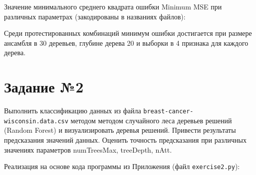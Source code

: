 \documentclass{article} %
\begin{document}
\clearpage
Значение минимального среднего квадрата ошибки Minimum MSE
при различных параметрах (закодированы в названиях файлов):


\begin{figure}[H]
	\centering
	\hfill
\end{figure}
\begin{figure}[H]
	\centering
	\hfill
\end{figure}
\begin{figure}[H]
	\centering
	\hfill
\end{figure}
\begin{figure}[H]
	\centering
	\hfill
\end{figure}
\bigskip

Среди протестированных комбинаций минимум ошибки достигается
при размере ансамбля в 30 деревьев,
глубине дерева 20 и выборки в 4 признака для каждого дерева.

\clearpage
\section{Задание №2}
Выполнить классификацию данных из файла
\verb$breast-cancer-wisconsin.data.csv$ методом
методом случайного леса деревьев решений (Random Forest) и визуализировать деревья
решений. Привести результаты предсказания значений данных. Оценить точность
предсказания при различных значениях параметров numTreesMax, treeDepth, nAtt.
\bigskip

Реализация на основе кода программы из Приложения (файл \verb$exercise2.py$):
\bigskip
\end{document}
